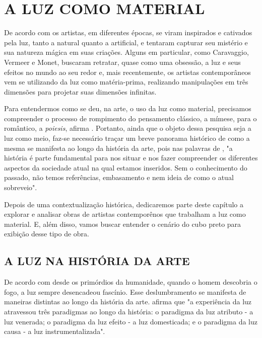 \chapter{A LUZ COMO MATERIAL}

De acordo com  os artistas, em diferentes épocas, se viram inspirados e cativados pela luz, tanto a natural quanto a artificial, e tentaram capturar seu mistério e sua natureza mágica em suas criações. Alguns em particular, como Caravaggio, Vermeer e Monet, buscaram retratar, quase como uma obsessão, a luz e seus efeitos no mundo ao seu redor e, mais recentemente, os artistas contemporâneos vem se utilizando da luz como matéria-prima, realizando manipulações em três dimensões para projetar suas dimensões infinitas. 

Para entendermos como se deu, na arte, o uso da luz como material, precisamos compreender o processo de rompimento do pensamento clássico, a mímese, para o romântico, a \textit{poiesis}, afirma . Portanto, ainda que o objeto dessa pesquisa seja a luz como meio, faz-se necessário traçar um breve panorama histórico de como a mesma se manifesta ao longo da história da arte, pois nas palavras de , "a história é parte fundamental para nos situar e nos fazer compreender os diferentes aspectos da sociedade atual na qual estamos inseridos. Sem o conhecimento do passado, não temos referências, embasamento e nem ideia de como o atual sobreveio". 

Depois de uma contextualização histórica, dedicaremos parte deste capítulo a explorar e analisar obras de artistas contemporênos que trabalham a luz como material. E, além disso, vamos buscar entender o cenário do cubo preto para exibição desse tipo de obra.


\section{A LUZ NA HISTÓRIA DA ARTE}

De acordo com   desde os primórdios da humanidade, quando o homem descobria o fogo, a luz sempre desencadeou fascínio. Esse deslumbramento se manifesta de maneiras distintas ao longo da história da arte.  afirma que "a experiência da luz atravessou três paradigmas ao longo da história: o paradigma da luz atributo - a luz venerada; o paradigma da luz efeito - a luz domesticada; e o paradigma da luz causa - a luz instrumentalizada".

